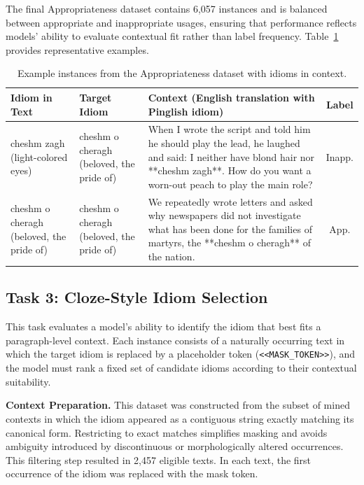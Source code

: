 \documentclass[11pt,a4paper]{article}
\begin{document}
The final Appropriateness dataset contains 6,057 instances and is balanced between appropriate and inappropriate usages, ensuring that performance reflects models’ ability to evaluate contextual fit rather than label frequency. Table~\ref{tab:app_samples} provides representative examples.

\begin{table}[htbp]
\centering
\caption{Example instances from the Appropriateness dataset with idioms in context.}
\label{tab:app_samples}
\begin{tabular}{p{3cm} p{3cm} p{7cm} c}
\toprule
\textbf{Idiom in Text} & \textbf{Target Idiom} & \textbf{Context (English translation with Pinglish idiom)} & \textbf{Label} \\
\midrule
cheshm zagh \newline(light-colored eyes) & cheshm o cheragh \newline(beloved, the pride of) & 
When I wrote the script and told him he should play the lead, he laughed and said: I neither have blond hair nor **cheshm zagh**. How do you want a worn-out peach to play the main role? & Inapp. \\
\addlinespace
cheshm o cheragh \newline(beloved, the pride of) & cheshm o cheragh \newline(beloved, the pride of) &
We repeatedly wrote letters and asked why newspapers did not investigate what has been done for the families of martyrs, the **cheshm o cheragh** of the nation. & App. \\
\bottomrule
\end{tabular}
\end{table}

\subsection{Task 3: Cloze-Style Idiom Selection}
This task evaluates a model’s ability to identify the idiom that best fits a paragraph-level context. Each instance consists of a naturally occurring text in which the target idiom is replaced by a placeholder token (\texttt{<<MASK\_TOKEN>>}), and the model must rank a fixed set of candidate idioms according to their contextual suitability.

\textbf{Context Preparation.}
This dataset was constructed from the subset of mined contexts in which the idiom appeared as a contiguous string exactly matching its canonical form. Restricting to exact matches simplifies masking and avoids ambiguity introduced by discontinuous or morphologically altered occurrences. This filtering step resulted in 2,457 eligible texts. In each text, the first occurrence of the idiom was replaced with the mask token.
\end{document}
